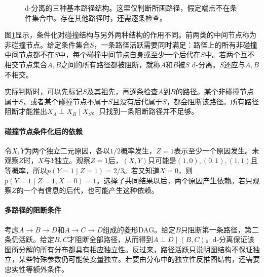 \begin{figure}[htbp]
\centering
{}
\caption{d-分离的三种基本路径结构。这里仅判断所画路径，假定端点不在条件集合中。存在其他路径时，还需逐条检查。}
\label{fig:bayes-d-separation}
\end{figure}

图\ref{fig:bayes-d-separation}显示，条件化对碰撞结构与另外两种结构的作用不同。前两类的中间节点称为非碰撞节点。给定条件集合$S$，一条路径活跃需要同时满足：路径上的所有非碰撞中间节点都不在$S$中，每个碰撞中间节点自身或至少一个后代在$S$中。若两个互不相交节点集合$A,B$之间的所有路径都被阻断，就称$A$和$B$被$S$ d-分离。$S$还应与$A,B$不相交。

实际判断时，可以先标记$S$及其祖先，再逐条检查$A$到$B$的路径。某个非碰撞节点属于$S$，或者某个碰撞节点不属于$S$且没有后代属于$S$，都会阻断该路径。所有路径阻断才能推出$X_A\perp X_B\mid X_S$。只找到一条阻断路径并不足够。

\paragraph{碰撞节点条件化后的依赖}
令$X,Y$为两个独立二元原因，各以$1/2$概率发生，$Z=1$表示至少一个原因发生。未观察$Z$时，$X$与$Y$独立。观察$Z=1$后，$(X,Y)$只可能是$(1,0),(0,1),(1,1)$且等概率，所以$p(Y=1\mid Z=1)=2/3$。若又知道$X=0$，则$p(Y=1\mid Z=1,X=0)=1$。选择了共同结果以后，两个原因产生依赖。若只观察$Z$的一个有信息的后代，也可能产生这种依赖。

\paragraph{多路径的阻断条件}
考虑$A\to B\to D$和$A\to C\to D$组成的菱形DAG。给定$B$只阻断第一条路径，第二条仍活跃。给定$B,C$才阻断全部路径，从而得到$A\perp D\mid(B,C)$。d-分离保证该图所分解的所有分布都具有相应独立性。反过来，路径活跃只说明图结构不保证独立，某些特殊参数仍可能使变量独立。若要由分布中的独立性反推图结构，还需要忠实性等额外条件。



